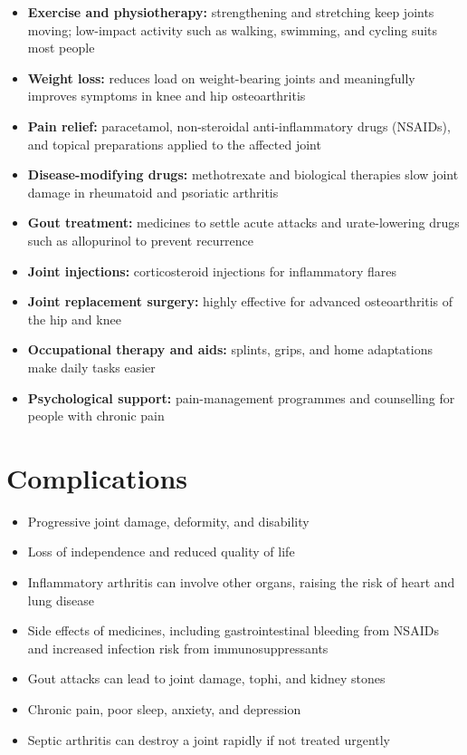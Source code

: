 \begin{itemize}
    \item \textbf{Exercise and physiotherapy:} strengthening and stretching keep joints moving; low-impact activity such as walking, swimming, and cycling suits most people
    \item \textbf{Weight loss:} reduces load on weight-bearing joints and meaningfully improves symptoms in knee and hip osteoarthritis
    \item \textbf{Pain relief:} paracetamol, non-steroidal anti-inflammatory drugs (NSAIDs), and topical preparations applied to the affected joint
    \item \textbf{Disease-modifying drugs:} methotrexate and biological therapies slow joint damage in rheumatoid and psoriatic arthritis
    \item \textbf{Gout treatment:} medicines to settle acute attacks and urate-lowering drugs such as allopurinol to prevent recurrence
    \item \textbf{Joint injections:} corticosteroid injections for inflammatory flares
    \item \textbf{Joint replacement surgery:} highly effective for advanced osteoarthritis of the hip and knee
    \item \textbf{Occupational therapy and aids:} splints, grips, and home adaptations make daily tasks easier
    \item \textbf{Psychological support:} pain-management programmes and counselling for people with chronic pain
\end{itemize}

\section*{Complications}
\begin{itemize}
    \item Progressive joint damage, deformity, and disability
    \item Loss of independence and reduced quality of life
    \item Inflammatory arthritis can involve other organs, raising the risk of heart and lung disease
    \item Side effects of medicines, including gastrointestinal bleeding from NSAIDs and increased infection risk from immunosuppressants
    \item Gout attacks can lead to joint damage, tophi, and kidney stones
    \item Chronic pain, poor sleep, anxiety, and depression
    \item Septic arthritis can destroy a joint rapidly if not treated urgently
\end{itemize}

